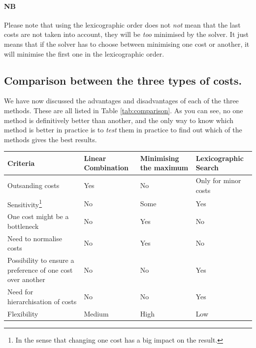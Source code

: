 \paragraph{NB} Please note that using the lexicographic order does not \textit{not} mean that the last costs are not taken into account, they will be \textit{too} minimised by the solver. It just means that if the solver has to choose between minimising one cost or another, it will minimise the first one in the lexicographic order. 

\subsection{Comparison between the three types of costs.}

We have now discussed the advantages and disadvantages of each of the three methods. These are all listed in Table \ref{tab:comparison}. As you can see, no one method is definitively better than another, and the only way to know which method is better in practice is to \textit{test} them in practice to find out which of the methods gives the best results. 
\newpage
\begin{center}
    \centering
    \label{tab:comparison}
    \begin{tabularx}{\textwidth}{|>{\centering\arraybackslash}p{4cm}|>{\centering\arraybackslash}X|>{\centering\arraybackslash}X|>{\centering\arraybackslash}X|}
        \hline
        \textbf{Criteria} & \textbf{Linear Combination} & \textbf{Minimising the maximum} & \textbf{Lexicographic Search} \\
        \hline
        Outsanding costs & \cellcolor{red!25}Yes & \cellcolor{green!25}No & \cellcolor{orange!25}Only for minor costs \\
        \hline
        Sensitivity\footnote{In the sense that changing one cost has a big impact on the result.} & \cellcolor{red!25}No & \cellcolor{orange!25}Some & \cellcolor{green!25}Yes \\
        \hline
        One cost might be a bottleneck & \cellcolor{green!25}No & \cellcolor{red!25}Yes & \cellcolor{green!25}No \\
        \hline
        Need to normalise costs& \cellcolor{green!25}No & \cellcolor{red!25}Yes & \cellcolor{green!25}No \\
        \hline
        Possibility to ensure a preference of one cost over another  & \cellcolor{red!25}No & \cellcolor{red!25}No & \cellcolor{green!25}Yes \\
        \hline
        Need for hierarchisation of costs & \cellcolor{green!25}No & \cellcolor{green!25}No & \cellcolor{red!25}Yes \\
        \hline
        Flexibility & \cellcolor{orange!25}Medium & \cellcolor{green!25}High & \cellcolor{red!25}Low \\
        \hline

    \end{tabularx}
\end{center}

